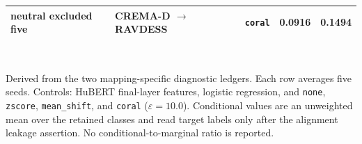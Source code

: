 \begin{table}[!t]
\begin{tabular}{lllrr}
    neutral excluded five & CREMA-D $\rightarrow$ RAVDESS & \texttt{coral} & 0.0916 & 0.1494 \\
    \bottomrule
  \end{tabular}
  \\[2pt]
  \begin{minipage}{\linewidth}\footnotesize Derived from the two mapping-specific diagnostic ledgers. Each row averages five seeds. Controls: HuBERT final-layer features, logistic regression, and \texttt{none}, \texttt{zscore}, \texttt{mean\_shift}, and \texttt{coral} ($\varepsilon=10.0$). Conditional values are an unweighted mean over the retained classes and read target labels only after the alignment leakage assertion. No conditional-to-marginal ratio is reported.\end{minipage}
\end{table}
